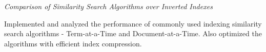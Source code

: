 \documentclass[10pt]{article}
\newcommand{\spc}{\vspace{1mm}}
\begin{document}
\textit{Comparison of Similarity Search Algorithms over Inverted Indexes}
\begin{compactitem}
\item {Implemented and analyzed the performance of commonly used indexing similarity search algorithms - Term-at-a-Time and Document-at-a-Time. Also optimized the algorithms  with efficient index compression.}
\end{compactitem}
\spc




\end{document}
